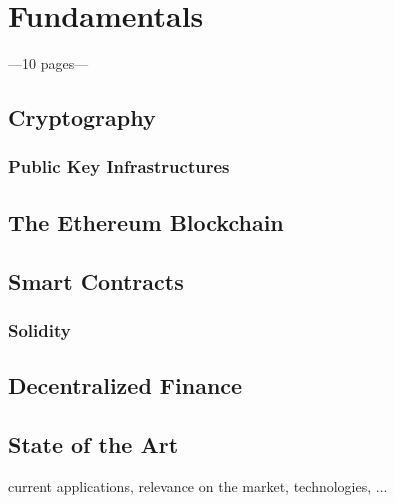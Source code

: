 \chapter{Fundamentals}
\label{cha:Fundamentals}

---10 pages---

\section{Cryptography}
\subsection{Public Key Infrastructures}
\section{The Ethereum Blockchain}
\section{Smart Contracts}
\subsection{Solidity}
\section{Decentralized Finance}
\section{State of the Art}
current applications, relevance on the market, technologies, ...